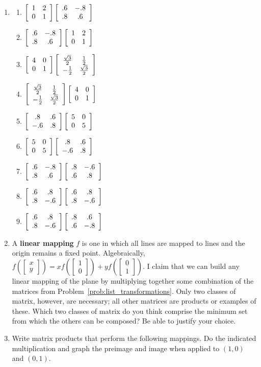 \documentclass[../gatm.tex]{subfiles}
\begin{document}
\begin{enumerate}
\setcounter{enumi}{\value{bruh_count}}
\item[]
\begin{multicols}{3}
\begin{enumerate}
\item $\left[\begin{array}{cc} 1 & 2 \\ 0 & 1 \end{array}\right]\left[\begin{array}{cc} .6 & -.8 \\ .8 & .6 \end{array}\right]$
\item $\left[\begin{array}{cc} .6 & -.8 \\ .8 & .6 \end{array}\right]\left[\begin{array}{cc} 1 & 2 \\ 0 & 1 \end{array}\right]$
\item $\left[\begin{array}{cc} 4 & 0 \\ 0 & 1 \end{array}\right]\left[\begin{array}{cc} \frac{\sqrt{3}}{2} & \frac{1}{2} \\ -\frac{1}{2} & \frac{\sqrt{3}}{2} \end{array}\right]$
\item $\left[\begin{array}{cc} \frac{\sqrt{3}}{2} & \frac{1}{2} \\ -\frac{1}{2} & \frac{\sqrt{3}}{2} \end{array}\right]\left[\begin{array}{cc} 4 & 0 \\ 0 & 1 \end{array}\right]$
\item $\left[\begin{array}{cc} .8 & .6 \\ -.6 & .8 \end{array}\right]\left[\begin{array}{cc} 5 & 0 \\ 0 & 5 \end{array}\right]$
\item $\left[\begin{array}{cc} 5 & 0 \\ 0 & 5 \end{array}\right]\left[\begin{array}{cc} .8 & .6 \\ -.6 & .8 \end{array}\right]$
\item $\left[\begin{array}{cc} .6 & -.8 \\ .8 & .6 \end{array}\right]\left[\begin{array}{cc} .8 & -.6 \\ .6 & .8 \end{array}\right]$
\item $\left[\begin{array}{cc} .6 & .8 \\ .8 & -.6 \end{array}\right]\left[\begin{array}{cc} .6 & .8 \\ .8 & -.6 \end{array}\right]$
\item $\left[\begin{array}{cc} .6 & .8 \\ .8 & -.6 \end{array}\right]\left[\begin{array}{cc} .8 & .6 \\ .6 & -.8 \end{array}\right]$
\end{enumerate}
\end{multicols}
\item A \textbf{linear mapping} $f$ is one in which all lines are mapped to lines and the origin remains a fixed point. Algebraically, $f\left(\left[\begin{array}{c}x \\ y \end{array}\right]\right)=xf\left(\left[\begin{array}{c}1 \\ 0 \end{array}\right]\right)+yf\left(\left[\begin{array}{c}0 \\ 1 \end{array}\right]\right).$ I claim that we can build any linear mapping of the plane by multiplying together some combination of the matrices from Problem~\ref{prob:list_transformations}. Only two classes of matrix, however, are necessary; all other matrices are products or examples of these. Which two classes of matrix do you think comprise the minimum set from which the others can be composed? Be able to justify your choice.
\item Write matrix products that perform the following mappings. Do the indicated multiplication and graph the preimage and image when applied to $(1,0)$ and $(0,1)$.

\end{enumerate}
\end{document}
